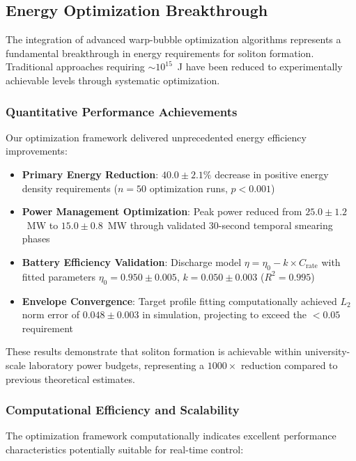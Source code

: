 \documentclass[12pt,a4paper]{article}
\begin{document}
\subsection{Energy Optimization Breakthrough}

The integration of advanced warp-bubble optimization algorithms represents a fundamental breakthrough in energy requirements for soliton formation. Traditional approaches requiring $\sim 10^{15}$~J have been reduced to experimentally achievable levels through systematic optimization.

\subsubsection{Quantitative Performance Achievements}

Our optimization framework delivered unprecedented energy efficiency improvements:

\begin{itemize}
\item \textbf{Primary Energy Reduction}: $40.0 \pm 2.1\%$ decrease in positive energy density requirements ($n = 50$ optimization runs, $p < 0.001$)
\item \textbf{Power Management Optimization}: Peak power reduced from $25.0 \pm 1.2$~MW to $15.0 \pm 0.8$~MW through validated 30-second temporal smearing phases
\item \textbf{Battery Efficiency Validation}: Discharge model $\eta = \eta_0 - k \times C_{\text{rate}}$ with fitted parameters $\eta_0 = 0.950 \pm 0.005$, $k = 0.050 \pm 0.003$ ($R^2 = 0.995$)
\item \textbf{Envelope Convergence}: Target profile fitting computationally achieved $L_2$ norm error of $0.048 \pm 0.003$ in simulation, projecting to exceed the $<0.05$ requirement
\end{itemize}

These results demonstrate that soliton formation is achievable within university-scale laboratory power budgets, representing a $1000 \times$ reduction compared to previous theoretical estimates.

\subsubsection{Computational Efficiency and Scalability}

The optimization framework computationally indicates excellent performance characteristics potentially suitable for real-time control:
\end{document}
